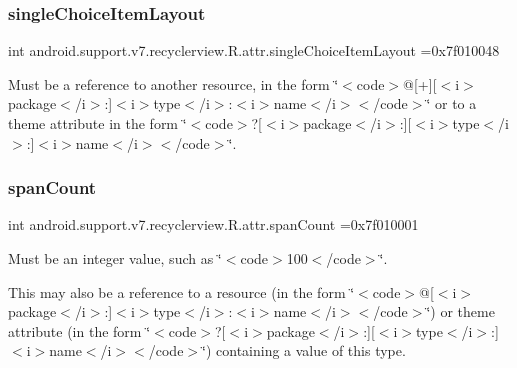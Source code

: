 \subsubsection{\texorpdfstring{single\+Choice\+Item\+Layout}{singleChoiceItemLayout}}
{\footnotesize\ttfamily int android.\+support.\+v7.\+recyclerview.\+R.\+attr.\+single\+Choice\+Item\+Layout =0x7f010048\hspace{0.3cm}{\ttfamily [static]}}

Must be a reference to another resource, in the form \char`\"{}$<$code$>$@\mbox{[}+\mbox{]}\mbox{[}$<$i$>$package$<$/i$>$\+:\mbox{]}$<$i$>$type$<$/i$>$\+:$<$i$>$name$<$/i$>$$<$/code$>$\char`\"{} or to a theme attribute in the form \char`\"{}$<$code$>$?\mbox{[}$<$i$>$package$<$/i$>$\+:\mbox{]}\mbox{[}$<$i$>$type$<$/i$>$\+:\mbox{]}$<$i$>$name$<$/i$>$$<$/code$>$\char`\"{}. \mbox{\label{classandroid_1_1support_1_1v7_1_1recyclerview_1_1R_1_1attr_aee75cbd8a9f6dbd4f25da2bacd1abe90}} 
\subsubsection{\texorpdfstring{span\+Count}{spanCount}}
{\footnotesize\ttfamily int android.\+support.\+v7.\+recyclerview.\+R.\+attr.\+span\+Count =0x7f010001\hspace{0.3cm}{\ttfamily [static]}}

Must be an integer value, such as \char`\"{}$<$code$>$100$<$/code$>$\char`\"{}. 

This may also be a reference to a resource (in the form \char`\"{}$<$code$>$@\mbox{[}$<$i$>$package$<$/i$>$\+:\mbox{]}$<$i$>$type$<$/i$>$\+:$<$i$>$name$<$/i$>$$<$/code$>$\char`\"{}) or theme attribute (in the form \char`\"{}$<$code$>$?\mbox{[}$<$i$>$package$<$/i$>$\+:\mbox{]}\mbox{[}$<$i$>$type$<$/i$>$\+:\mbox{]}$<$i$>$name$<$/i$>$$<$/code$>$\char`\"{}) containing a value of this type. \mbox{\label{classandroid_1_1support_1_1v7_1_1recyclerview_1_1R_1_1attr_a22ff6f4c4baa02a931f86e4fa1e46bf4}} 
